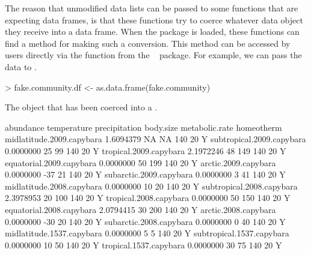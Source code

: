 \documentclass[a4paper]{report}
\numberwithin{exercise}{section}
\begin{document}
\begin{article}
The reason that unmodified data lists can be passed to some functions that are expecting data frames, is that these functions try to coerce whatever data object they receive into a data frame.  When the  package is loaded, these functions can find a method for making such a conversion.  This method can be accessed by users directly via the  function from the \R\  package.  For example, we can pass the  data to .
\begin{Schunk}
\begin{Sinput}
> fake.community.df <- as.data.frame(fake.community)
\end{Sinput}
\end{Schunk}
\begin{table*}
\caption{The   object that has been coerced into a .}
\label{tab:dataframe}
\begin{Schunk}
\begin{Soutput}
                          abundance temperature precipitation body.size metabolic.rate homeotherm
midlatitude.2009.capybara 1.6094379          NA            NA       140             20          Y
subtropical.2009.capybara 0.0000000          25            99       140             20          Y
tropical.2009.capybara    2.1972246          48           149       140             20          Y
equatorial.2009.capybara  0.0000000          50           199       140             20          Y
arctic.2009.capybara      0.0000000         -37            21       140             20          Y
subarctic.2009.capybara   0.0000000           3            41       140             20          Y
midlatitude.2008.capybara 0.0000000          10            20       140             20          Y
subtropical.2008.capybara 2.3978953          20           100       140             20          Y
tropical.2008.capybara    0.0000000          50           150       140             20          Y
equatorial.2008.capybara  2.0794415          30           200       140             20          Y
arctic.2008.capybara      0.0000000         -30            20       140             20          Y
subarctic.2008.capybara   0.0000000           0            40       140             20          Y
midlatitude.1537.capybara 0.0000000           5             5       140             20          Y
subtropical.1537.capybara 0.0000000          10            50       140             20          Y
tropical.1537.capybara    0.0000000          30            75       140             20          Y

\end{Soutput}
\end{Schunk}
\end{table*}
\end{article}
\end{document}
